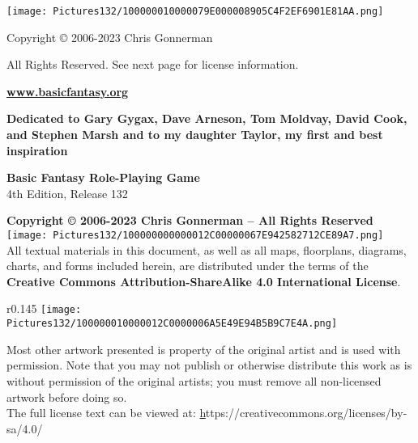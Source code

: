 \documentclass[a4paper,twoside,openany,10pt]{book}
\begin{document}
	
\justifying
\thispagestyle{empty}

\begin{center}
\texttt{[image: Pictures132/100000010000079E000008905C4F2EF6901E81AA.png]}
\end{center}

\begin{center}

{{\huge Copyright © 2006-2023 Chris Gonnerman}}\bigskip

{\LARGE All Rights Reserved. See next page for license information}.\bigskip

{\LARGE \href{https://www.basicfantasy.org}{\textbf{www.basicfantasy.org}}}\bigskip
 
\end{center}

\pagebreak

\thispagestyle{empty}

\begin{center}
\textbf{Dedicated to Gary Gygax, Dave Arneson, Tom Moldvay, David Cook, and Stephen Marsh and to my daughter Taylor, my first and best inspiration}
\end{center}

\addvspace{1.5cm}

{\large \textbf{Basic Fantasy Role-Playing Game}}\\

{\large 4th Edition, Release 132}

\textbf{Copyright © 2006-2023 Chris Gonnerman -- All Rights Reserved}
\hfill
\texttt{[image: Pictures132/100000000000012C00000067E942582712CE89A7.png]}\\

All textual materials in this document, as well as all maps, floorplans, diagrams, charts, and forms included herein, are distributed under the terms of the \textbf{Creative Commons Attribution-ShareAlike 4.0 International License}.
\begin{wrapfigure}{r}{0.145\textwidth}
	\texttt{[image: Pictures132/100000010000012C0000006A5E49E94B5B9C7E4A.png]}
\end{wrapfigure}

Most other artwork presented is property of the original artist and is used with permission. Note that you may not publish or otherwise distribute this work as is without permission of the original artists; you must remove all non-licensed artwork before doing so.\\

The full license text can be viewed at:  \href{https://creativecommons.org/licenses/by-sa/4.0/} https://creativecommons.org/licenses/by-sa/4.0/\\
\end{document}
